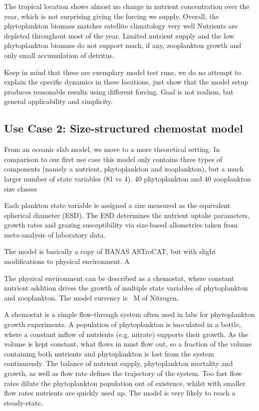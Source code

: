 \documentclass[journal abbreviation, manuscript]{copernicus}
\begin{document}
The tropical location shows almost no change in nutrient concentration over the year, which is not surprising giving the forcing we supply. 
Overall, the phytoplankton biomass matches satellite climatology very well 
Nutrients are depleted throughout most of the year.
Limited nutrient supply and the low phytoplankton biomass do not support much, if any, zooplankton growth and only small accumulation of detritus.

Keep in mind that these are exemplary model test runs, we do no attempt to explain the specific dynamics in these locations, just show that the model setup produces reasonable results using different forcing. Goal is not realism, but general applicability and simplicity. 





\subsection{Use Case 2: Size-structured chemostat model}
From an oceanic slab model, we move to a more theoretical setting.
In comparison to our first use case this model only contains three types of components (namely a nutrient, phytoplankton and zooplankton), but a much larger number of state variables (81 vs 4). 
40 phytoplankton and 40 zooplankton size classes

Each plankton state variable is assigned a size measured as the equivalent spherical diameter (ESD). The ESD determines the nutrient uptake parameters, growth rates and grazing susceptibility via size-based allometries taken from meta-analysis of laboratory data.

The model is basically a copy of BANAS ASTroCAT, but with slight modifications to physical environment. A 

The physical environment can be described as a chemostat, where constant nutrient addition drives the growth of multiple state variables of phytoplankton and zooplankton. The model currency is \unit{\mu M} of Nitrogen.

A chemostat is a simple flow-through system often used in labs for phytoplankton growth experiments. A population of phytoplankton is inoculated in a bottle, where a constant inflow of nutrients (e.g. nitrate) supports their growth. As the volume is kept constant, what flows in must flow out, so a fraction of the volume containing both nutrients and phytoplankton is lost from the system continuously. The balance of nutrient supply, phytoplankton mortality and growth, as well as flow rate defines the trajectory of the system. Too fast flow rates dilute the phytoplankton population out of existence, whilst with smaller flow rates nutrients are quickly used up. The model is very likely to reach a steady-state.
\end{document}
